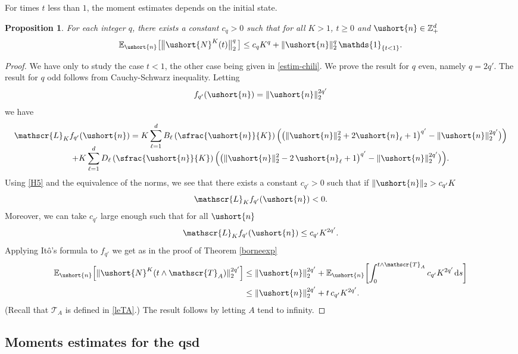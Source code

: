 \documentclass[10pt]{amsart}
\newcommand{\scaleto}[2]{#1}
\let\mathcal\mathscr
\numberwithin{equation}{section}
\theoremstyle{plain}
\newtheorem{proposition}[theorem]{Proposition}
\theoremstyle{definition}
\newcommand{\E}{{\mathbb{E}}}
\newcommand{\zentiers}{{\mathbb{Z}}}
\newcommand{\domaine}{\zentiers_{+}^{d}}
\newcommand{\sK}{K}
\newcommand{\gen}{\mathscr{L}_{\sK}}
\newcommand{\un}{\mathds{1}}
\newcommand{\vecn}{\ushort{n}}
\newcommand{\leproc}{\ushort{N}^{K}}
\newcommand{\dd}{\hspace{1pt}\mathrm{d}}
\newcommand{\normdeux}[1]{\|#1\|_{2}}\let\snormdeux\normdeux
\begin{document}
For times $t$ less than $1$, the moment estimates depends on the initial state.
\begin{proposition}\label{tempscourts}
For each integer $q$, there exists a constant $c_{q}>0$ such that for all $K>1$, $t\geq 0$ and $\vecn\in \domaine$
\[
\E_{\vecn}\bigl[\big\|\leproc(t)\big\|^{q}_{2}\,\bigr]\le c_{q} K^{q}
+\normdeux{\vecn}^{q} \, \un_{\{t< 1\}}.
\]
\end{proposition}
\begin{proof} We have only to study the case $t< 1$, the other case being given in \eqref{estim-chili}.
We prove the result for $q$ even, namely $q=\scaleto{2}{6pt}q'$. The result for $q$ odd follows from Cauchy-Schwarz inequality.
Letting
\[
f_{q'}(\vecn)=\normdeux{\vecn}^{\scaleto{2q'}{5.4pt}}
\]
we have
\begin{multline*}
\gen f_{q'}(\vecn)=K\sum_{\ell=1}^{d}B_{\ell}\left(\sfrac{\vecn}{K}\right)\Bigl(\bigl(\normdeux{\vecn}^{2}+2\vecn_{\ell}+1\bigr)^{\scaleto{q'}{6.5pt}}-
\normdeux{\vecn}^{\scaleto{2q'}{5.4pt}}\bigr)\Bigr)\\[-8pt]
+K\sum_{\ell=1}^{d}D_{\ell}\left(\sfrac{\vecn}{K}\right)\Bigl(\bigl(\normdeux{\vecn}^{2}-2\,\vecn_{\ell}+1\bigr)^{\scaleto{q'}{6.5pt}}-
\normdeux{\vecn}^{\scaleto{2q'}{5.4pt}}\bigr)\Bigr).
\end{multline*}
Using \eqref{H5} and the equivalence of the norms, we see that there exists a constant $c_{q'}>0$ such that if
$\normdeux{\vecn}> c_{q'} K$
\[
\gen f_{q'}(\vecn)<0.
\]
Moreover, we can take $c_{q'}$ large enough such that for all $\vecn$
\[
\gen f_{q'}(\vecn)\le c_{q'} K^{2q'}.
\]
Applying Itô's formula to $f_{q'}$ we get as in the proof of Theorem
\ref{borneexp}
\begin{align*}
\E_{\vecn}\Bigl[\|\leproc(t\wedge \mathcal{T}_A)\|^{\scaleto{2q'}{6pt}}_{2}\Bigr]
& \le \normdeux{\vecn}^{\scaleto{2q'}{5.3pt}}+\E_{\vecn}\biggl[\int_{0}^{t\wedge \mathcal{T}_A} c_{q'} K^{2q'}\dd s\biggr]\\
& \le \normdeux{\vecn}^{\scaleto{2q'}{5.3pt}}+t\, c_{q'} K^{2q'}.
\end{align*}
(Recall that $\mathcal{T}_A$ is defined in \eqref{leTA}.)
The result follows by letting $A$ tend to infinity.
\end{proof}

\subsection{Moments estimates for the qsd}
\end{document}
